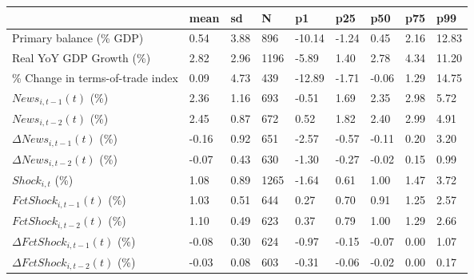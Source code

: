 \begin{table}[htbp]
\begin{tabular}{|l|l|l|l|l|l|l|l|l|}\hline  
 & mean  & sd  & N  & p1  & p25  & p50  & p75  & p99  \\ \hline  
Primary balance (\% GDP) &      0.54 &      3.88 &       896 &    -10.14 &     -1.24 &      0.45 &      2.16 &     12.83 \\ \hline 
Real YoY GDP Growth (\%) &      2.82 &      2.96 &      1196 &     -5.89 &      1.40 &      2.78 &      4.34 &     11.20 \\ \hline 
\% Change in terms-of-trade index &      0.09 &      4.73 &       439 &    -12.89 &     -1.71 &     -0.06 &      1.29 &     14.75 \\ \hline 
$ News_{i,t-1}(t)$ (\%) &      2.36 &      1.16 &       693 &     -0.51 &      1.69 &      2.35 &      2.98 &      5.72 \\ \hline 
$ News_{i,t-2}(t)$ (\%) &      2.45 &      0.87 &       672 &      0.52 &      1.82 &      2.40 &      2.99 &      4.91 \\ \hline 
$ \Delta News_{i,t-1}(t)$ (\%) &     -0.16 &      0.92 &       651 &     -2.57 &     -0.57 &     -0.11 &      0.20 &      3.20 \\ \hline 
$ \Delta News_{i,t-2}(t)$ (\%) &     -0.07 &      0.43 &       630 &     -1.30 &     -0.27 &     -0.02 &      0.15 &      0.99 \\ \hline 
$ Shock_{i,t}$ (\%) &      1.08 &      0.89 &      1265 &     -1.64 &      0.61 &      1.00 &      1.47 &      3.72 \\ \hline 
$ FctShock_{i,t-1}(t)$ (\%) &      1.03 &      0.51 &       644 &      0.27 &      0.70 &      0.91 &      1.25 &      2.57 \\ \hline 
$ FctShock_{i,t-2}(t)$ (\%) &      1.10 &      0.49 &       623 &      0.37 &      0.79 &      1.00 &      1.29 &      2.66 \\ \hline 
$ \Delta FctShock_{i,t-1}(t)$ (\%) &     -0.08 &      0.30 &       624 &     -0.97 &     -0.15 &     -0.07 &      0.00 &      1.07 \\ \hline 
$ \Delta FctShock_{i,t-2}(t)$ (\%) &     -0.03 &      0.08 &       603 &     -0.31 &     -0.06 &     -0.02 &      0.00 &      0.17 \\ \hline 
  \end{tabular}
\end{table}
